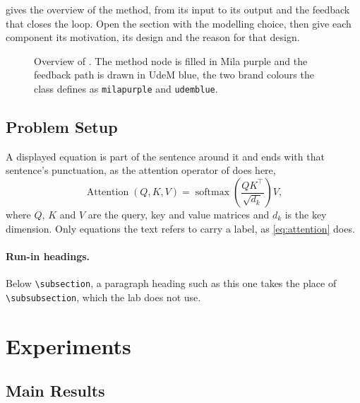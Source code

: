 \documentclass{banglab}
\begin{document}
 gives the overview of the method, from its input to its output and the feedback that closes the loop.
Open the section with the modelling choice, then give each component its motivation, its design and the reason for that design.

\begin{figure}[t]
  \centering
  
  \caption{Overview of \method{}. The method node is filled in Mila purple and the feedback path is drawn in UdeM blue, the two brand colours the class defines as \texttt{milapurple} and \texttt{udemblue}.}
  \label{fig:overview}
\end{figure}

\subsection{Problem Setup}
\label{sec:problem-setup}

A displayed equation is part of the sentence around it and ends with that sentence's punctuation, as the attention operator of \citet{vaswani2017attention} does here,
\begin{equation}
  \operatorname{Attention}(Q, K, V) = \operatorname{softmax}\!\left(\frac{QK^\top}{\sqrt{d_k}}\right) V,
  \label{eq:attention}
\end{equation}
where $Q$, $K$ and $V$ are the query, key and value matrices and $d_k$ is the key dimension.
Only equations the text refers to carry a label, as \cref{eq:attention} does.

\paragraph{Run-in headings.}
Below \verb|\subsection|, a paragraph heading such as this one takes the place of \verb|\subsubsection|, which the lab does not use.

\section{Experiments}
\label{sec:experiments}

\subsection{Main Results}
\label{sec:main-results}
\end{document}
